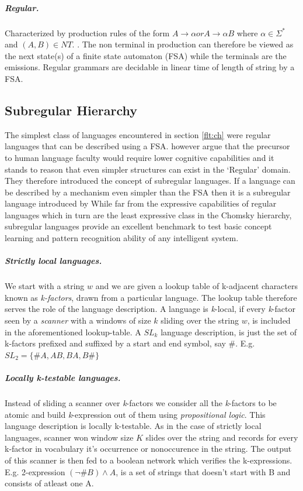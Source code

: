 \subparagraph{Regular.} Characterized by production rules of the form $A \rightarrow \alpha or A \rightarrow \alpha B$ where $\alpha \in \Sigma^{*}$ and $(A, B) \in NT$. . The non terminal in production can therefore be viewed as the next state(s) of a finite state automaton (FSA) while the terminals are the emissions. Regular grammars are decidable in linear time of length of string by a FSA.


\subsection{Subregular Hierarchy}\label{flt:sh}
The simplest class of languages encountered in section \ref{flt:ch} were regular languages that can be described using a FSA. \cite{Jager2012} however argue that the precursor to human language faculty would require lower cognitive capabilities and it stands to reason that even simpler structures can exist in the \lq Regular\rq{} domain. They therefore introduced the concept of subregular languages. If a language can be described by a mechanism even simpler than the FSA then it is a subregular language introduced by While far from the expressive capabilities of regular languages which in turn are the least expressive class in the Chomsky hierarchy, subregular languages provide an excellent benchmark to test basic concept learning and pattern recognition ability of any intelligent system.

\subparagraph{Strictly local languages.} We start with a string $w$ and we are given a lookup table of k-adjacent characters known as \textit{k-factors}, drawn from a particular language. The lookup table therefore serves the role of the language description. A language is \textit{k}-local, if every \textit{k}-factor seen by a \textit{scanner} with a windows of size $k$ sliding over the string $w$, is included in the aforementioned lookup-table. A $SL_k$ language description, is just the set of k-factors prefixed and suffixed by a start and end symbol, say $\#$. E.g. $SL_2 = \{\#A,AB,BA,B\#\}$   

\subparagraph{Locally k-testable languages.} Instead of sliding a scanner over \textit{k}-factors we consider all the \textit{k}-factors to be atomic and build \textit{k}-expression out of them using \textit{propositional logic}. This language description is locally k-testable. As in the case of strictly local languages, scanner won window size $K$ slides over the string and records for every k-factor in vocabulary it's occurrence or nonoccurence in the string. The output of this scanner is then fed to a boolean network which verifies the k-expressions. E.g. 2-expression $(\neg \# B) \wedge A$, is a set of strings that doesn't start with B and consists of atleast one A.


